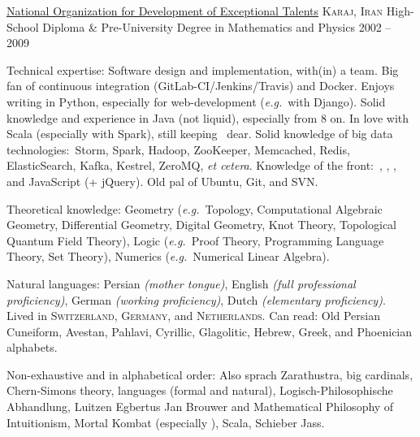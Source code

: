 \documentclass[10pt,a4paper]{article}
\begin{document}
\headedsection
  {\href{https://en.wikipedia.org/wiki/National_Organization_for_Development_of_Exceptional_Talents}{National Organization for Development of Exceptional Talents}}
  {\textsc{Karaj, Iran}} {%
  \headedsubsection
    {High-School Diploma \& Pre-University Degree in Mathematics and Physics}
    {2002 -- 2009} {}
}


\spacedhrule{0.5em}{-0.4em}


\inlineheadsection  %
  {Technical expertise:}
  {Software design and implementation, with(in) a team.  Big fan of continuous integration (GitLab-CI/Jenkins/Travis) and Docker.  Enjoys writing in Python, especially for web-development (\textit{e.g.}\ with Django). Solid knowledge and experience in Java (not liquid), especially from 8 on. In love with Scala (especially with Spark), still keeping \CPP\ dear. Solid knowledge of big data technologies:\ Storm, Spark, Hadoop, ZooKeeper, Memcached, Redis, ElasticSearch, Kafka, Kestrel, ZeroMQ, \textit{et cetera}. Knowledge of the front:\ , , , and JavaScript (+ jQuery). Old pal of Ubuntu, Git, and SVN.}

\vspace{0.5em}
\inlineheadsection
  {Theoretical knowledge:}
  {Geometry (\textit{e.g.}~Topology, Computational Algebraic Geometry, Differential Geometry, Digital Geometry, Knot Theory, Topological Quantum Field Theory), Logic (\textit{e.g.}~Proof Theory, Programming Language Theory, Set Theory), Numerics (\textit{e.g.}~Numerical Linear Algebra).}
  
\vspace{0.5em}
\inlineheadsection
  {Natural languages:}
  {Persian \emph{(mother tongue)}, English \emph{(full professional proficiency)}, German \emph{(working proficiency)}, Dutch \emph{(elementary proficiency)}. Lived in \textsc{Switzerland}, \textsc{Germany}, and \textsc{Netherlands}. Can read: Old Persian Cuneiform, Avestan, Pahlavi, Cyrillic, Glagolitic, Hebrew, Greek, and Phoenician alphabets.}


\spacedhrule{1.6em}{-0.4em}


\inlineheadsection
  {Non-exhaustive and in alphabetical order:}
  {Also sprach Zarathustra, big cardinals, Chern-Simons theory, languages (formal and natural), Logisch-Philosophische Abhandlung, Luitzen Egbertus Jan Brouwer and Mathematical Philosophy of Intuitionism, Mortal Kombat (especially ), Scala, Schieber Jass.}
\end{document}
